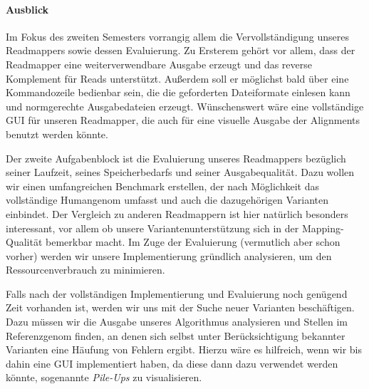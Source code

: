 \paragraph{Ausblick}

Im Fokus des zweiten Semesters vorrangig allem die Vervollständigung unseres Readmappers sowie dessen Evaluierung. Zu Ersterem gehört vor allem, dass der Readmapper eine weiterverwendbare Ausgabe erzeugt und das reverse Komplement für Reads unterstützt. Außerdem soll er möglichst bald über eine Kommandozeile bedienbar sein, die die geforderten Dateiformate einlesen kann und normgerechte Ausgabedateien erzeugt. Wünschenswert wäre eine vollständige GUI für unseren Readmapper, die auch für eine visuelle Ausgabe der Alignments benutzt werden könnte.

Der zweite Aufgabenblock ist die Evaluierung unseres Readmappers bezüglich seiner Laufzeit, seines Speicherbedarfs und seiner Ausgabequalität. Dazu wollen wir einen umfangreichen Benchmark erstellen, der nach Möglichkeit das vollständige Humangenom umfasst und auch die dazugehörigen Varianten einbindet. Der Vergleich zu anderen Readmappern ist hier natürlich besonders interessant, vor allem ob unsere Variantenunterstützung sich in der Mapping-Qualität bemerkbar macht. Im Zuge der Evaluierung (vermutlich aber schon vorher) werden wir unsere Implementierung gründlich analysieren, um den Ressourcenverbrauch zu minimieren.

Falls nach der vollständigen Implementierung und Evaluierung noch genügend Zeit vorhanden ist, werden wir uns mit der Suche neuer Varianten beschäftigen. Dazu müssen wir die Ausgabe unseres Algorithmus analysieren und Stellen im Referenzgenom finden, an denen sich selbst unter Berücksichtigung bekannter Varianten eine Häufung von Fehlern ergibt. Hierzu wäre es hilfreich, wenn wir bis dahin eine GUI implementiert haben, da diese dann dazu verwendet werden könnte, sogenannte \textit{Pile-Ups} zu visualisieren.